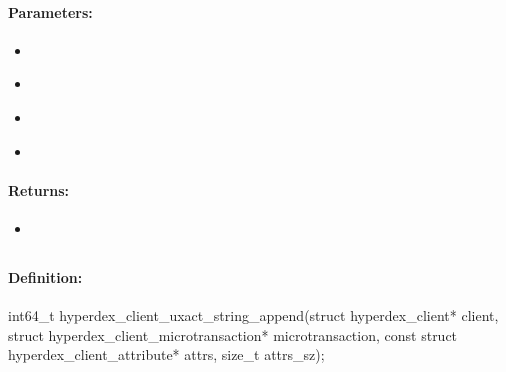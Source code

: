 \paragraph{Parameters:}
\begin{itemize}[noitemsep]
\item {}\\

\item {}\\

\item {}\\

\item {}\\

\end{itemize}

\paragraph{Returns:}
\begin{itemize}[noitemsep]
\item {}\\

\end{itemize}

\pagebreak
\subsection{}
\label{api:c:uxact_string_append}


\paragraph{Definition:}
\begin{ccode}
int64_t hyperdex_client_uxact_string_append(struct hyperdex_client* client,
        struct hyperdex_client_microtransaction* microtransaction,
        const struct hyperdex_client_attribute* attrs, size_t attrs_sz);
\end{ccode}

